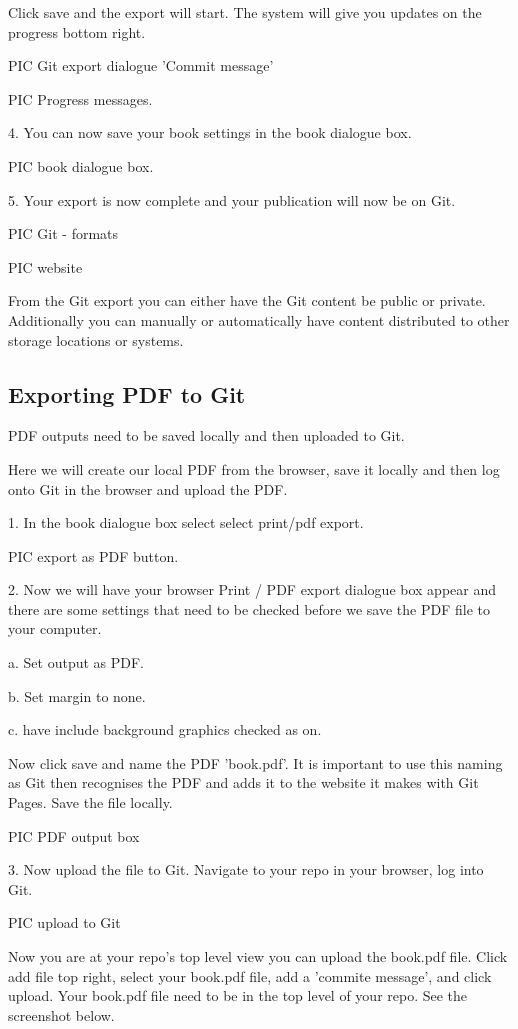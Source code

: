 \documentclass{article}
\begin{document}
Click save and the export will start. The system will give you updates on the progress bottom right.


PIC Git export dialogue  'Commit message'


PIC Progress messages.


4. You can now save your book settings in the book dialogue box.


PIC book dialogue box.


5. Your export is now complete and your publication will now be on Git.


PIC Git - formats


PIC website 


From the Git export you can either have the Git content be public or private. Additionally you can manually or automatically have content distributed to other storage locations or systems.


\subsection{Exporting PDF to Git}\label{H9093471}



PDF outputs need to be saved locally and then uploaded to Git. 


Here we will create our local PDF from the browser, save it locally and then log onto Git in the browser and upload the PDF.


1. In the book dialogue box select select print/pdf export.


PIC export as PDF button.


2. Now we will have your browser Print / PDF export dialogue box appear and there are some settings that need to be checked before we save the PDF file to your computer. 


a. Set output as PDF.


b. Set margin to none.


c. have include background graphics checked as on.


Now click save and name the PDF 'book.pdf'. It is important to use this naming as Git then recognises the PDF and adds it to the website it makes with Git Pages. Save the file locally.


PIC PDF output box


3. Now upload the file to Git. Navigate to your repo in your browser, log into Git.


PIC upload to Git


Now you are at your repo's top level view you can upload the book.pdf file. Click add file top right, select your book.pdf file, add a 'commite message', and click upload. Your book.pdf file need to be in the top level of your repo. See the screenshot below.
\end{document}
